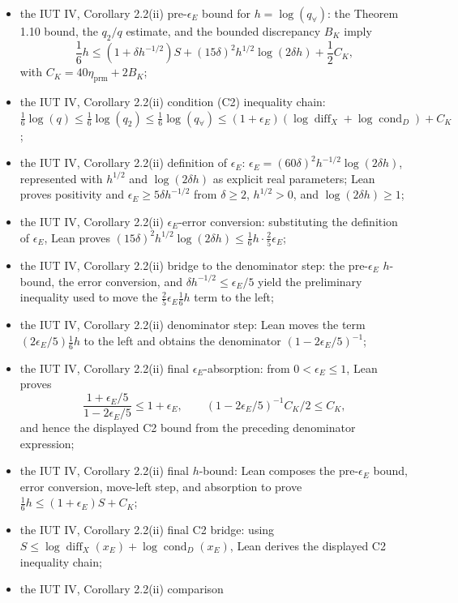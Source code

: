 \documentclass[11pt]{article}
\begin{document}
\begin{itemize}
\item the IUT IV, Corollary 2.2(ii) pre-\(\epsilon_E\) bound for
  \(h=\log(q_\forall)\):
  the Theorem 1.10 bound, the \(q_2/q\) estimate, and the bounded discrepancy
  \(B_K\) imply
  \[
    \frac16h\le(1+\delta h^{-1/2})S
    +(15\delta)^2h^{1/2}\log(2\delta h)+\frac12 C_K,
  \]
  with \(C_K=40\eta_{\mathrm{prm}}+2B_K\);
\item the IUT IV, Corollary 2.2(ii) condition (C2) inequality chain:
  \(\frac16\log(q)\le\frac16\log(q_2)\le\frac16\log(q_\forall)\le
   (1+\epsilon_E)(\log\operatorname{diff}_X+\log\operatorname{cond}_D)+C_K\);
\item the IUT IV, Corollary 2.2(ii) definition of \(\epsilon_E\):
  \(\epsilon_E=(60\delta)^2h^{-1/2}\log(2\delta h)\), represented with
  \(h^{1/2}\) and \(\log(2\delta h)\) as explicit real parameters; Lean proves
  positivity and \(\epsilon_E\ge5\delta h^{-1/2}\) from
  \(\delta\ge2\), \(h^{1/2}>0\), and \(\log(2\delta h)\ge1\);
\item the IUT IV, Corollary 2.2(ii) \(\epsilon_E\)-error conversion:
  substituting the definition of \(\epsilon_E\), Lean proves
  \((15\delta)^2h^{1/2}\log(2\delta h)
   \le \frac16h\cdot\frac25\epsilon_E\);
\item the IUT IV, Corollary 2.2(ii) bridge to the denominator step:
  the pre-\(\epsilon_E\) \(h\)-bound, the error conversion, and
  \(\delta h^{-1/2}\le\epsilon_E/5\) yield the preliminary inequality used to
  move the \(\frac25\epsilon_E\frac16h\) term to the left;
\item the IUT IV, Corollary 2.2(ii) denominator step:
  Lean moves the term
  \((2\epsilon_E/5)\frac16h\) to the left and obtains the denominator
  \((1-2\epsilon_E/5)^{-1}\);
\item the IUT IV, Corollary 2.2(ii) final \(\epsilon_E\)-absorption:
  from \(0<\epsilon_E\le1\), Lean proves
  \[
    \frac{1+\epsilon_E/5}{1-2\epsilon_E/5}\le1+\epsilon_E,
    \qquad
    (1-2\epsilon_E/5)^{-1}C_K/2\le C_K,
  \]
  and hence the displayed C2 bound from the preceding denominator expression;
\item the IUT IV, Corollary 2.2(ii) final \(h\)-bound:
  Lean composes the pre-\(\epsilon_E\) bound, error conversion, move-left step,
  and absorption to prove
  \(\frac16h\le(1+\epsilon_E)S+C_K\);
\item the IUT IV, Corollary 2.2(ii) final C2 bridge:
  using \(S\le\log\operatorname{diff}_X(x_E)+\log\operatorname{cond}_D(x_E)\),
  Lean derives the displayed C2 inequality chain;
\item the IUT IV, Corollary 2.2(ii) comparison

\end{itemize}
\end{document}
